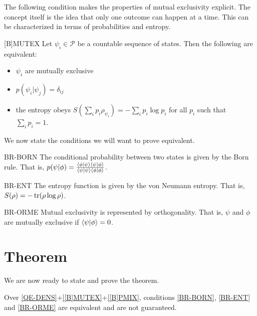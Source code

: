 \documentclass{techbrief}
\begin{document}
The following condition makes the properties of mutual exclusivity explicit. The concept itself is the idea that only one outcome can happen at a time. This can be characterized in terms of probabilities and entropy.

\begin{condition}{[B]MUTEX}
	Let $\psi_i \in \mathcal{P}$ be a countable sequence of states. Then the following are equivalent:
	\begin{itemize}
		\item $\psi_i$ are mutually exclusive
		\item $p(\psi_i | \psi_j) = \delta_{ij}$
		\item the entropy obeys $S(\sum_i p_i \rho_{\psi_i}) = - \sum_i p_i \log p_i$ for all $p_i$ such that $\sum_i p_i = 1$.
	\end{itemize}
\end{condition}

We now state the conditions we will want to prove equivalent.

\begin{condition}{BR-BORN}
	The conditional probability between two states is given by the Born rule. That is, $p(\psi|\phi) = \frac{\langle \phi | \psi \rangle\langle \psi | \phi \rangle}{\langle \psi | \psi \rangle\langle \phi | \phi \rangle}$.
\end{condition}

\begin{condition}{BR-ENT}
	The entropy function is given by the von Neumann entropy. That is, $S(\rho) = - \operatorname{tr}(\rho \log \rho)$.
\end{condition}

\begin{condition}{BR-ORME}
	Mutual exclusivity is represented by orthogonality. That is, $\psi$ and $\phi$ are mutually exclusive if $\langle\psi | \phi \rangle = 0$.
\end{condition}

\section{Theorem}

We are now ready to state and prove the theorem.

\begin{thrm}
	Over \ref{QE-DENS}+\ref{[B]MUTEX}+\ref{[B]PMIX}, conditions \ref{BR-BORN}, \ref{BR-ENT} and \ref{BR-ORME} are equivalent and are not guaranteed.
\end{thrm}
\end{document}
